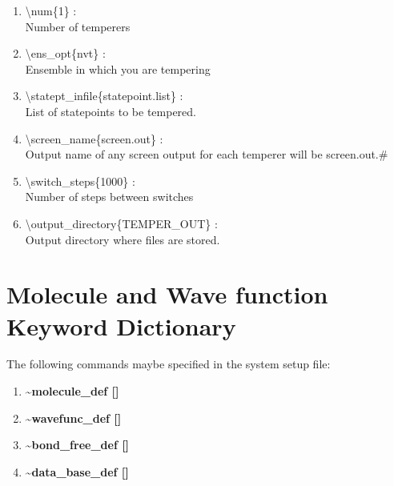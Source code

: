 \documentclass[12pt,titlepage]{article}
\begin{document}
\begin{enumerate}

 \vspace{0.15in} 
 \item  \textbackslash num\{1\} : \\
   Number of temperers

 \vspace{0.15in} 
 \item  \textbackslash ens\_opt\{nvt\} : \\
   Ensemble in which you are tempering

 \vspace{0.15in} 
 \item  \textbackslash statept\_infile\{statepoint.list\} : \\
   List of statepoints to be tempered.

 \vspace{0.15in} 
 \item  \textbackslash screen\_name\{screen.out\} : \\
   Output name of any screen output for each temperer will be screen.out.\#

 \vspace{0.15in} 
 \item  \textbackslash switch\_steps\{1000\} : \\
   Number of steps between switches

 \vspace{0.15in} 
 \item  \textbackslash output\_directory\{TEMPER\_OUT\} : \\
   Output directory where files are stored.

\end{enumerate}
\newpage



\section{\bf Molecule and Wave function Keyword Dictionary} 

The following commands maybe specified in the system setup file:
\begin{enumerate}
\item {\bf \~{}molecule\_def []}
\item {\bf \~{}wavefunc\_def []}
\item {\bf \~{}bond\_free\_def []}
\item {\bf \~{}data\_base\_def []}
\end{enumerate}
\end{document}
